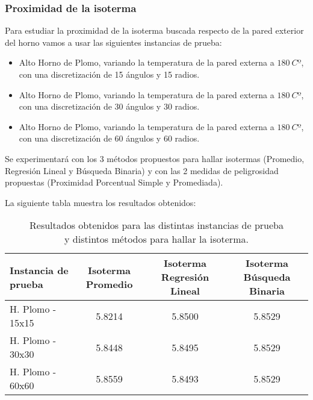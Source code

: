 \subsubsection{Proximidad de la isoterma}


Para estudiar la proximidad de la isoterma buscada respecto de la pared exterior del horno vamos a usar las siguientes instancias de prueba:
\begin{itemize}
    \item Alto Horno de Plomo, variando la temperatura de la pared externa a $180\ Cº$, con una discretización de 15 ángulos y 15 radios.
    \item Alto Horno de Plomo, variando la temperatura de la pared externa a $180\ Cº$, con una discretización de 30 ángulos y 30 radios.
    \item Alto Horno de Plomo, variando la temperatura de la pared externa a $180\ Cº$, con una discretización de 60 ángulos y 60 radios.
\end{itemize}

Se experimentará con los 3 métodos propuestos para hallar isotermas (Promedio, Regresión Lineal y Búsqueda Binaria) y con las 2 medidas de peligrosidad propuestas (Proximidad Porcentual Simple y Promediada).

La siguiente tabla muestra los resultados obtenidos:

\begin{table}[H]
    \begin{center}
        \begin{tabular}{| l | c | c | c |}
            \hline
            Instancia de prueba & Isoterma Promedio & Isoterma Regresión Lineal & Isoterma Búsqueda Binaria \\ \hline
            H. Plomo - 15x15    & 5.8214            & 5.8500                    & 5.8529                    \\
            H. Plomo - 30x30    & 5.8448            & 5.8495                    & 5.8529                    \\
            H. Plomo - 60x60    & 5.8559            & 5.8493                    & 5.8529                    \\
            \hline
        \end{tabular}
        \captionsetup{justification=centering}
        \caption{Resultados obtenidos para las distintas instancias de prueba\\ y distintos métodos para hallar la isoterma.}
        \label{tabla-isoterma-plomo}
    \end{center}
\end{table}

